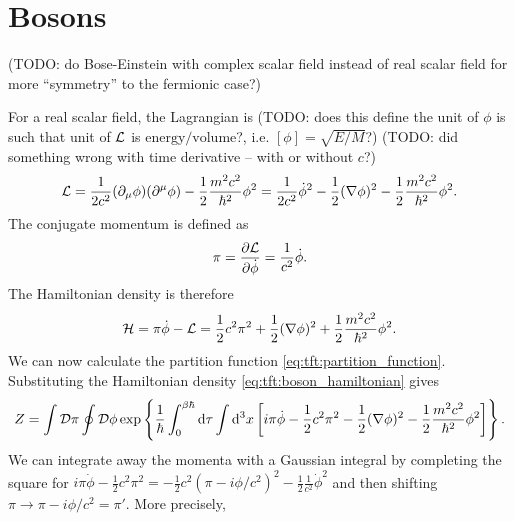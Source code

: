 \section{Bosons}

(TODO: do Bose-Einstein with complex scalar field instead of real scalar field for more ``symmetry'' to the fermionic case?)

For a real scalar field, the Lagrangian is 
(TODO: does this define the unit of $\phi$ is such that unit of $\mathcal{L}$ is $\text{energy} / \text{volume}$?, i.e. $[\phi] = \sqrt{E/M}$?)
(TODO: did something wrong with time derivative -- with or without $c$?)
\begin{equation}
	\mathcal{L} = \frac{1}{2 c^2} (\partial_\mu \phi) (\partial^\mu \phi) - \frac12 \frac{m^2 c^2}{\hbar^2} \phi^2
	      = \frac{1}{2 c^2} \dot{\phi}^2 - \frac12 (\nabla \phi)^2 - \frac12 \frac{m^2 c^2}{\hbar^2} \phi^2 .
\end{equation}
The conjugate momentum is defined as
\begin{equation}
	\pi = \pdv{\mathcal{L}}{\dot{\phi}} = \frac{1}{c^2} \dot{\phi} .
\end{equation}
The Hamiltonian density is therefore
\begin{equation}
	\mathcal{H} = \pi \dot{\phi} - \mathcal{L} = \frac12 c^2 \pi^2 + \frac12 (\nabla \phi)^2 + \frac12 \frac{m^2 c^2}{\hbar^2} \phi^2 .
\label{eq:tft:boson_hamiltonian}
\end{equation}
We can now calculate the partition function \eqref{eq:tft:partition_function}.
Substituting the Hamiltonian density \eqref{eq:tft:boson_hamiltonian} gives
\begin{equation}
	Z = \int \mathcal{D} \pi \oint \mathcal{D} \phi \exp \left\{ \frac{1}{\hbar} \int_0^{\beta \hbar} \mathop{}\!\mathrm{d} \tau \int \mathop{}\!\mathrm{d}^3 x \left[ i \pi \dot{\phi} - \frac12 c^2 \pi^2 - \frac12 (\nabla \phi)^2 - \frac12 \frac{m^2 c^2}{\hbar^2} \phi^2 \right] \right\} .
\end{equation}
We can integrate away the momenta with a Gaussian integral by completing the square for $i \pi \dot{\phi} - \frac12 c^2 \pi^2 = -\frac12 c^2 (\pi - i \phi / c^2)^2 - \frac12 \frac{1}{c^2} \dot{\phi}^2$ and then shifting $\pi \rightarrow \pi - i \phi / c^2 = \pi'$.
More precisely,
